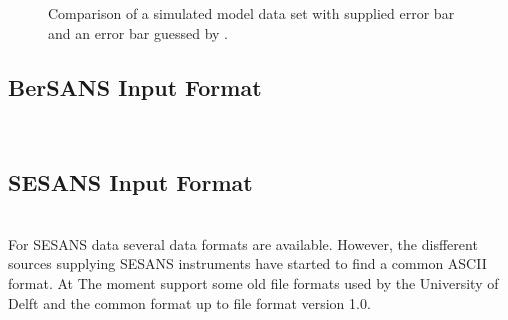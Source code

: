 \begin{figure}[htb]
\begin{center}
\end{center}
\caption{Comparison of a simulated model data set with supplied error bar and an error bar guessed by \SASfit.}
\label{fig:ErrBar}
\end{figure}

\vspace{1cm}

\subsection{BerSANS Input Format} \hspace{1pt}\\

\subsection{SESANS Input Format} \hspace{1pt}\\

For SESANS data several data formats are available. However, the disfferent sources supplying SESANS instruments have started to find a common ASCII format. At The moment \SASfit support some old file formats used by the University of Delft and the common format up to file format version 1.0.  

